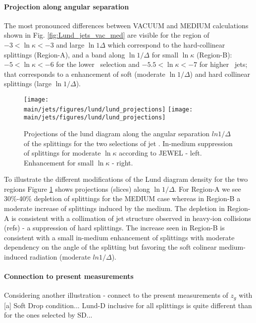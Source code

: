 \paragraph{Projection along angular separation}
The most pronounced differences between VACUUM and MEDIUM calculations shown in Fig. \ref{fig:Lund_jets_vac_med} are visible for the region of $-3 < \ln \kappa < -3$ and large $\ln 1\Delta$ which correspond to the hard-collinear splittings (Region-A), and a band along $\ln 1/\Delta$ for small $\ln \kappa$ (Region-B): $-5 < \ln \kappa < -6$ for the lower \pt\ selection and $-5.5 < \ln \kappa < -7$ for higher \pt\ jets; that corresponds to a enhancement of soft (moderate $\ln 1/\Delta$) and hard collinear splittings (large $\ln 1/\Delta$).

\begin{figure}[htbp]
	\centering
	\texttt{[image: \\main/jets/figures/lund/lund\_projections]}
	\texttt{[image: \\main/jets/figures/lund/lund\_projections]}
	\caption{Projections of the lund diagram along the angular separation $ln 1/\Delta$ of the splittings for the two selections of jet \pt. In-medium suppression of splittings for moderate $\ln{\kappa}$ according to JEWEL - left. Enhancement for small $\ln{\kappa}$ - right.}
	\label{fig:Lund_projections}
\end{figure}

To illustrate the different modifications of the Lund diagram density for the two regions Figure \ref{fig:Lund_projections} shows projections (slices) along $\ln 1/\Delta$. For Region-A we see 30\%-40\% depletion of splittings for the MEDIUM case whereas in Region-B a moderate increase of splittings induced by the medium. The depletion in Region-A is consistent with a collimation of jet structure observed in heavy-ion collisions (refs) - a suppression of hard splittings. The increase seen in Region-B is consistent with a small in-medium enhancement of splittings with moderate dependency on the angle of the splitting but favoring the soft colinear medium-induced radiation (moderate $ln 1/\Delta$).

\paragraph{Connection to present measurements}

Considering another illustration - connect to the present measurements of $z_{g}$ with [a] Soft Drop condition... Lund-D inclusive for all splittings is quite different than for the ones selected by SD...


